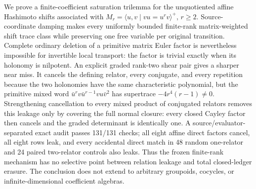 We prove a finite-coefficient saturation trilemma for the unquotiented affine
Hashimoto shifts associated with
$M_r=\langle u,v\mid vu=u^rv\rangle^+$, $r\ge2$.  Source-coordinate damping
makes every uniformly bounded finite-rank matrix-weighted shift trace class
while preserving one free variable per original transition.  Complete ordinary deletion of a
primitive matrix Euler factor is nevertheless impossible for invertible local
transport: the factor is trivial exactly when its holonomy is nilpotent.  An
explicit graded rank-two shear pair gives a sharper near miss.  It cancels the
defining relator, every conjugate, and every repetition because the two
holonomies have the same characteristic polynomial, but the primitive mixed
word
$\bar u^r v\bar u^{r-1}vu\bar v^2$ has supertrace
$-4r^4(r-1)\ne0$.  Strengthening cancellation to every mixed product of
conjugated relators removes this leakage only by covering the full normal
closure: every closed Cayley factor then cancels and the graded determinant is
identically one.  A source/evaluator-separated exact audit passes 131/131
checks; all eight affine direct factors cancel, all eight rows leak, and every
accidental direct match in 48 random one-relator and 24 paired two-relator
controls also leaks.  Thus the frozen finite-rank mechanism has no selective
point between relation leakage and total closed-ledger erasure.  The conclusion
does not extend to arbitrary groupoids, cocycles, or infinite-dimensional
coefficient algebras.
